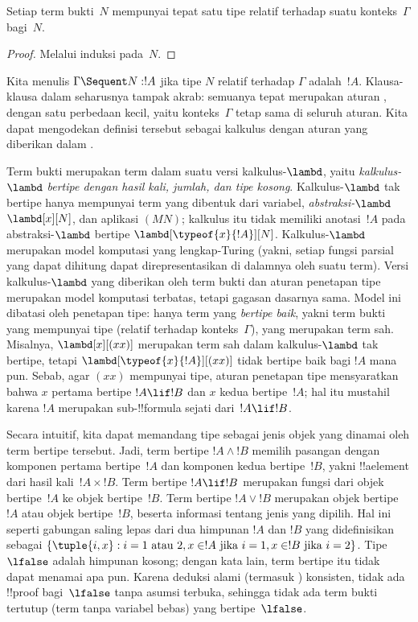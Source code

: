 \documentclass[../../../include/open-logic-section]{subfiles}
\begin{document}
\begin{prop}
Setiap term bukti~$N$ mempunyai tepat satu tipe relatif terhadap suatu
konteks~$\Gamma$ bagi~$N$.
\end{prop}

\begin{proof}
  Melalui induksi pada~$N$.
\end{proof}

Kita menulis $\Gamma \Sequent N:!A$ jika tipe $N$ relatif terhadap
$\Gamma$ adalah~$!A$. Klausa-klausa dalam  seharusnya
tampak akrab: semuanya tepat merupakan aturan , dengan satu
perbedaan kecil, yaitu konteks~$\Gamma$ tetap sama di seluruh aturan. Kita
dapat mengodekan definisi tersebut sebagai kalkulus  dengan aturan
yang diberikan dalam .



Term bukti merupakan term dalam suatu versi kalkulus-$\lambd$, yaitu
\emph{kalkulus-$\lambd$ bertipe dengan hasil kali, jumlah, dan tipe kosong}.
Kalkulus-$\lambd$ tak bertipe hanya mempunyai term yang dibentuk dari
variabel, \emph{abstraksi-$\lambd$}~$\lambd[x][N]$, dan aplikasi $(MN)$;
kalkulus itu tidak memiliki anotasi~$!A$ pada abstraksi-$\lambd$ bertipe
$\lambd[\typeof{x}{!A}][N]$. Kalkulus-$\lambd$ merupakan model komputasi
yang lengkap-Turing (yakni, setiap fungsi parsial yang dapat dihitung dapat
direpresentasikan di dalamnya oleh suatu term). Versi kalkulus-$\lambd$ yang
diberikan oleh term bukti dan aturan penetapan tipe merupakan model komputasi
terbatas, tetapi gagasan dasarnya sama. Model ini dibatasi oleh penetapan
tipe: hanya term yang \emph{bertipe baik}, yakni term bukti yang mempunyai
tipe (relatif terhadap konteks~$\Gamma$), yang merupakan term sah. Misalnya,
$\lambd[x][(xx)]$ merupakan term sah dalam kalkulus-$\lambd$ tak bertipe,
tetapi $\lambd[\typeof{x}{!A}][(xx)]$ tidak bertipe baik bagi $!A$ mana pun.
Sebab, agar $(xx)$ mempunyai tipe, aturan penetapan tipe mensyaratkan bahwa
$x$ pertama bertipe $!A \lif !B$ dan $x$ kedua bertipe~$!A$; hal itu mustahil
karena $!A$ merupakan sub-!!{formula} sejati dari~$!A \lif !B$.

Secara intuitif, kita dapat memandang tipe sebagai jenis objek yang dinamai
oleh term bertipe tersebut. Jadi, term bertipe $!A \land !B$ memilih pasangan
dengan komponen pertama bertipe~$!A$ dan komponen kedua bertipe~$!B$, yakni
!!a{element} dari hasil kali~$!A \times !B$. Term bertipe $!A \lif !B$
merupakan fungsi dari objek bertipe~$!A$ ke objek bertipe~$!B$. Term bertipe
$!A \lor !B$ merupakan objek bertipe~$!A$ atau objek bertipe~$!B$, beserta
informasi tentang jenis yang dipilih. Hal ini seperti gabungan saling lepas
dari dua himpunan $!A$ dan $!B$ yang didefinisikan sebagai
$\{\tuple{i,x}:i=1 \text{ atau } 2, x\in !A \text{ jika } i=1,
x\in !B \text{ jika } i=2\}$. Tipe $\lfalse$ adalah himpunan kosong;
dengan kata lain, term bertipe itu tidak dapat menamai apa pun. Karena
deduksi alami (termasuk ) konsisten, tidak ada !!{proof}
bagi~$\lfalse$ tanpa asumsi terbuka, sehingga tidak ada term bukti tertutup
(term tanpa variabel bebas) yang bertipe~$\lfalse$.
\end{document}
